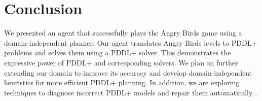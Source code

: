 \documentclass[letterpaper]{article} %
\begin{document}
\section{Conclusion}




We presented an agent that successfully plays the Angry Birds game  using a domain-independent planner.
Our agent translates Angry Birds levels to PDDL+ problems and solves them using a PDDL+ solver. 
This demonstrates the expressive power of PDDL+ and corresponding solvers. 
We plan on further extending our domain to improve its accuracy and develop domain-independent heuristics for more efficient PDDL+ planning. 
In addition, we are exploring techniques to diagnose incorrect PDDL+ models and repair them automatically~\cite{klenk2020model}. 






\small

\end{document}
